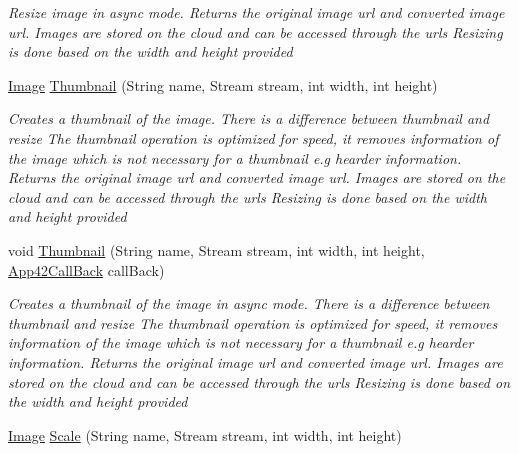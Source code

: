 \begin{DoxyCompactItemize}
\begin{DoxyCompactList}\small\item\em Resize image in async mode. Returns the original image url and converted image url. Images are stored on the cloud and can be accessed through the urls Resizing is done based on the width and height provided \end{DoxyCompactList}\item 
\hyperlink{classcom_1_1shephertz_1_1app42_1_1paas_1_1sdk_1_1csharp_1_1image_processor_1_1_image}{Image} \hyperlink{classcom_1_1shephertz_1_1app42_1_1paas_1_1sdk_1_1csharp_1_1image_processor_1_1_image_processor_service_ad4d841058049f8325f3320acdb56a88b}{Thumbnail} (String name, Stream stream, int width, int height)
\begin{DoxyCompactList}\small\item\em Creates a thumbnail of the image. There is a difference between thumbnail and resize The thumbnail operation is optimized for speed, it removes information of the image which is not necessary for a thumbnail e.\+g hearder information. Returns the original image url and converted image url. Images are stored on the cloud and can be accessed through the urls Resizing is done based on the width and height provided \end{DoxyCompactList}\item 
void \hyperlink{classcom_1_1shephertz_1_1app42_1_1paas_1_1sdk_1_1csharp_1_1image_processor_1_1_image_processor_service_a04993837936f0e1d8fab4322b7107d3d}{Thumbnail} (String name, Stream stream, int width, int height, \hyperlink{interfacecom_1_1shephertz_1_1app42_1_1paas_1_1sdk_1_1csharp_1_1_app42_call_back}{App42\+Call\+Back} call\+Back)
\begin{DoxyCompactList}\small\item\em Creates a thumbnail of the image in async mode. There is a difference between thumbnail and resize The thumbnail operation is optimized for speed, it removes information of the image which is not necessary for a thumbnail e.\+g hearder information. Returns the original image url and converted image url. Images are stored on the cloud and can be accessed through the urls Resizing is done based on the width and height provided \end{DoxyCompactList}\item 
\hyperlink{classcom_1_1shephertz_1_1app42_1_1paas_1_1sdk_1_1csharp_1_1image_processor_1_1_image}{Image} \hyperlink{classcom_1_1shephertz_1_1app42_1_1paas_1_1sdk_1_1csharp_1_1image_processor_1_1_image_processor_service_aa8a38509c97dc5fa79b39bc99eb52ebe}{Scale} (String name, Stream stream, int width, int height)

\end{DoxyCompactItemize}
